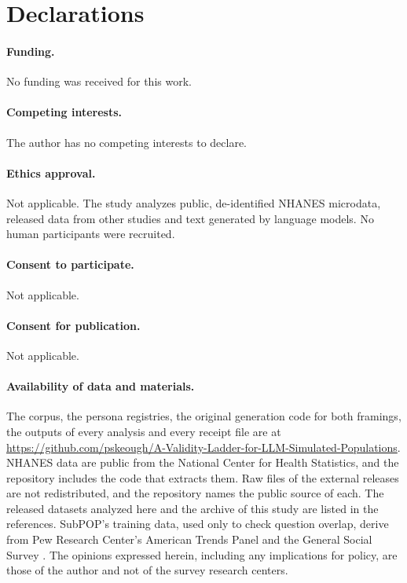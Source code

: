 
\section*{Declarations}

\paragraph{Funding.} No funding was received for this work.

\paragraph{Competing interests.} The author has no competing interests to declare.

\paragraph{Ethics approval.} Not applicable. The study analyzes public, de-identified NHANES microdata, released data from other studies and text generated by language models. No human participants were recruited.

\paragraph{Consent to participate.} Not applicable.

\paragraph{Consent for publication.} Not applicable.

\paragraph{Availability of data and materials.} The corpus, the persona registries, the original generation code for both framings, the outputs of every analysis and every receipt file are at \url{https://github.com/pskeough/A-Validity-Ladder-for-LLM-Simulated-Populations}. NHANES data are public from the National Center for Health Statistics, and the repository includes the code that extracts them. Raw files of the external releases are not redistributed, and the repository names the public source of each. The released datasets analyzed here \citep{nchs2018nhanesdata, bisbee2024data, argyle2023data, malmberg2026data} and the archive of this study \citep{keough2026archive} are listed in the references. SubPOP's training data, used only to check question overlap, derive from Pew Research Center's American Trends Panel and the General Social Survey \citep{davern2024gss}. The opinions expressed herein, including any implications for policy, are those of the author and not of the survey research centers.

